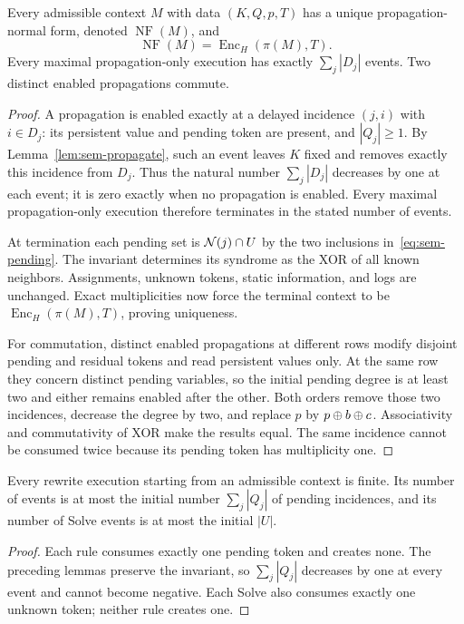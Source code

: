 \begin{lem}
\label{lem:sem-normalization}
Every admissible context $M$ with data $(K,Q,p,T)$ has a unique
propagation-normal form, denoted $\operatorname{NF}(M)$, and
\[
 \operatorname{NF}(M)=\operatorname{Enc}_H(\pi(M),T).
\]
Every maximal propagation-only execution has exactly
$\sum_j|D_j|$ events. Two distinct enabled propagations commute.
\end{lem}
\begin{proof}
A propagation is enabled exactly at a delayed incidence $(j,i)$ with
$i\in D_j$: its persistent value and pending token are present, and
$|Q_j|\geq1$. By Lemma~\ref{lem:sem-propagate}, such an event leaves $K$
fixed and removes exactly this incidence from $D_j$.
Thus the natural number $\sum_j|D_j|$ decreases by one at each event;
it is zero exactly when no propagation is enabled. Every maximal
propagation-only execution therefore terminates in the stated number of events.

At termination each pending set is $\mathcal{N}(j)\cap U$ by the two inclusions
in~\eqref{eq:sem-pending}. The invariant determines its syndrome as the XOR
of all known neighbors. Assignments, unknown tokens, static information,
and logs are unchanged. Exact multiplicities now force the terminal context
to be $\operatorname{Enc}_H(\pi(M),T)$, proving uniqueness.

For commutation, distinct enabled propagations at different rows modify
disjoint pending and residual tokens and read persistent values only.
At the same row they concern distinct pending variables, so the initial
pending degree is at least two and either remains enabled after the other.
Both orders remove those two incidences, decrease the degree by two, and
replace $p$ by $p\oplus b\oplus c$. Associativity and commutativity of XOR
make the results equal. The same incidence cannot be consumed twice because
its pending token has multiplicity one.
\end{proof}

\begin{prop}
\label{prop:sem-termination}
Every rewrite execution starting from an admissible context is finite.
Its number of events is at most the initial number $\sum_j|Q_j|$ of pending
incidences, and its number of Solve events is at most the initial $|U|$.
\end{prop}
\begin{proof}
Each rule consumes exactly one pending token and creates none. The preceding
lemmas preserve the invariant, so $\sum_j|Q_j|$ decreases by one at every
event and cannot become negative. Each Solve also consumes exactly one
unknown token; neither rule creates one.
\end{proof}

